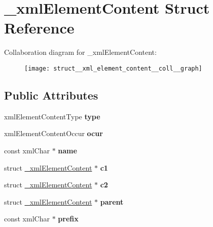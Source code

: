 \hypertarget{struct__xml_element_content}{\section{\-\_\-xml\-Element\-Content Struct Reference}
\label{struct__xml_element_content}
}


Collaboration diagram for \-\_\-xml\-Element\-Content\-:
\nopagebreak
\begin{figure}[H]
\begin{center}
\leavevmode
\texttt{[image: struct\_\_xml\_element\_content\_\_coll\_\_graph]}
\end{center}
\end{figure}
\subsection*{Public Attributes}
\begin{DoxyCompactItemize}
\item 
\hypertarget{struct__xml_element_content_a9ec31227deddf6cb534eaba958cc8a2a}{xml\-Element\-Content\-Type {\bfseries type}}\label{struct__xml_element_content_a9ec31227deddf6cb534eaba958cc8a2a}

\item 
\hypertarget{struct__xml_element_content_a45c3092e58963270a4c9640016b61ce3}{xml\-Element\-Content\-Occur {\bfseries ocur}}\label{struct__xml_element_content_a45c3092e58963270a4c9640016b61ce3}

\item 
\hypertarget{struct__xml_element_content_a3c814e1fcce494db3382965fee367342}{const xml\-Char $\ast$ {\bfseries name}}\label{struct__xml_element_content_a3c814e1fcce494db3382965fee367342}

\item 
\hypertarget{struct__xml_element_content_a79213e3823ffdba5e810539cecc0ba7b}{struct \hyperlink{struct__xml_element_content}{\-\_\-xml\-Element\-Content} $\ast$ {\bfseries c1}}\label{struct__xml_element_content_a79213e3823ffdba5e810539cecc0ba7b}

\item 
\hypertarget{struct__xml_element_content_a0e3adfa5e9910fa37bc302d66b254600}{struct \hyperlink{struct__xml_element_content}{\-\_\-xml\-Element\-Content} $\ast$ {\bfseries c2}}\label{struct__xml_element_content_a0e3adfa5e9910fa37bc302d66b254600}

\item 
\hypertarget{struct__xml_element_content_afc9791f9c8604d8232b98cccc1fa19cd}{struct \hyperlink{struct__xml_element_content}{\-\_\-xml\-Element\-Content} $\ast$ {\bfseries parent}}\label{struct__xml_element_content_afc9791f9c8604d8232b98cccc1fa19cd}

\item 
\hypertarget{struct__xml_element_content_a53d312c5dd947160bcbf5da8c6a2f4da}{const xml\-Char $\ast$ {\bfseries prefix}}\label{struct__xml_element_content_a53d312c5dd947160bcbf5da8c6a2f4da}

\end{DoxyCompactItemize}


